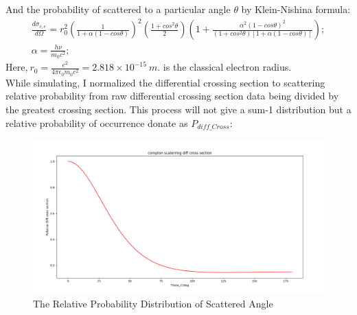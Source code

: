 \documentclass[12pt]{article}
\begin{document}
	And the probability of scattered to a particular angle $\theta$ by Klein-Nishina formula:
	\begin{gather}
		\frac{d\sigma_{c,e}}{d\Omega}=r_0^2(\frac{1}{1+\alpha(1-cos\theta)})^2(\frac{1+cos^2\theta}{2})(1+\frac{\alpha^2(1-cos\theta)^2}{(1+cos^2\theta)[1+\alpha(1-cos\theta)]});\\
	\alpha=\frac{h\nu}{m_0c^2};
	\end{gather}
	Here,$\ r_0=\frac{e^2}{4\pi \epsilon_0m_0c^2}=2.818\times 10^{-15}\ m.$  is the classical electron radius. \\
	While simulating, I normalized the differential crossing section to scattering relative probability from raw differential crossing section data being divided by the greatest crossing section. This process will not give a sum-1 distribution but a relative probability of occurrence donate as $P_{diff\_Cross}$:
	\begin{figure}[h]
		\centering
		\includegraphics[width=0.7\linewidth]{pic/Scattered_diffCS__simulation}
		\caption{The Relative Probability Distribution of Scattered Angle}
		\label{fig:scattereddiffcssimulation}
	\end{figure}
	
	
\end{document}
